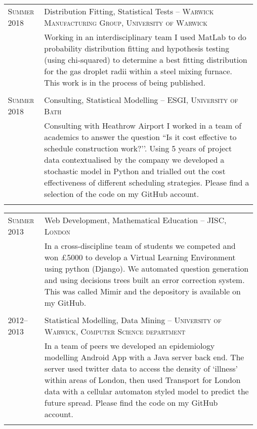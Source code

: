 \documentclass[a4paper,10pt]{article}
\begin{document}
\begin{tabular}{p{2.25cm}|p{15cm}}
	\textsc{Summer 2018}& Distribution Fitting, Statistical Tests -- \textsc{Warwick Manufacturing Group, University of Warwick}\\&\footnotesize{Working in an interdisciplinary team I used MatLab to do probability distribution fitting and hypothesis testing (using chi-squared) to determine a best fitting distribution for the gas droplet radii within a steel mixing furnace. This work is in the process of being published.}\\\multicolumn{2}{c}{} \\
	\textsc{Summer 2018} & Consulting, Statistical Modelling -- \textsc{ESGI, University of Bath} \\&\footnotesize{Consulting with Heathrow Airport I worked in a team of academics to answer the question ``Is it cost effective to schedule construction work?’’. Using 5 years of project data contextualised by the company we developed a stochastic model in Python and trialled out the cost effectiveness of different scheduling strategies. Please find a selection of the code on my GitHub account.}\\\multicolumn{2}{c}{} \\
\end{tabular}
\begin{tabular}{p{2.25cm}|p{15cm}}
	\textsc{Summer 2013} & Web Development, Mathematical Education -- \textsc{JISC, London} \\&\footnotesize{In a cross-discipline team of students we competed and won £5000 to develop a Virtual Learning Environment using python (Django). We automated question generation and using decisions trees built an error correction system. This was called Mimir and the depository is available on my GitHub.}\\\multicolumn{2}{c}{} \\
	\textsc{2012--2013} & Statistical Modelling, Data Mining -- \textsc{University of Warwick, Computer Science department} \\&\footnotesize{In a team of peers we developed an epidemiology modelling Android App with a Java server back end. The server used twitter data to access the density of `illness' within areas of London, then used Transport for London data with a cellular automaton styled model to predict the future spread. Please find the code on my GitHub account.}\\\multicolumn{2}{c}{}
\end{tabular}
\end{document}
